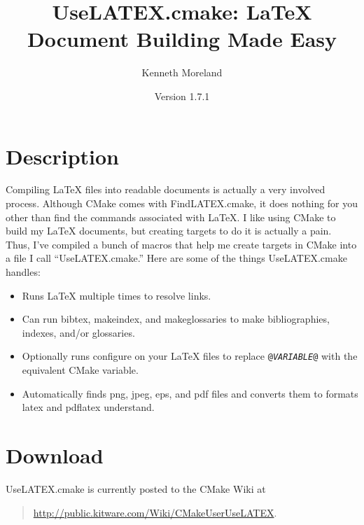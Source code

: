 \documentclass{article}
\newcommand{\UseLATEXVersion}{1.7.1}
\newcommand*{\textfile}[1]{\textsf{#1}}
\newcommand*{\textprog}[1]{\textfile{#1}}
\newcommand*{\textcmake}[1]{\texttt{#1}}
\newcommand*{\textvar}[1]{\textit{#1}}
\newcommand*{\UseLATEX}{\textfile{UseLATEX.cmake}\xspace}
\newcommand*{\latex}{\LaTeX\xspace}
\begin{document}
  \sloppy

  \title{UseLATEX.cmake: \latex Document Building Made Easy}
  \author{Kenneth Moreland}
  \date{Version \UseLATEXVersion}
  \maketitle

  \tableofcontents


  \section{Description}
  \label{sec:Description}

  Compiling \latex files into readable documents is actually a very
  involved process. Although CMake comes with \textfile{FindLATEX.cmake},
  it does nothing for you other than find the commands associated with
  \latex. I like using CMake to build my \latex documents, but creating
  targets to do it is actually a pain. Thus, I've compiled a bunch of
  macros that help me create targets in CMake into a file I call
  ``\UseLATEX.'' Here are some of the things \UseLATEX handles:

  \begin{itemize}
  \item Runs \latex multiple times to resolve links. 
  \item Can run \textprog{bibtex}, \textprog{makeindex}, and
    \textprog{makeglossaries} to make bibliographies, indexes, and/or
    glossaries.
  \item Optionally runs configure on your \latex files to replace
    \textcmake{@\textvar{VARIABLE}@} with the equivalent CMake variable.
  \item Automatically finds png, jpeg, eps, and pdf files and converts them
    to formats \textprog{latex} and \textprog{pdflatex} understand.
  \end{itemize}


  \section{Download}
  \label{sec:Download}

  \UseLATEX is currently posted to the CMake Wiki at
  \begin{quote}
    \href{http://public.kitware.com/Wiki/CMakeUserUseLATEX}{http://public.kitware.com/Wiki/CMakeUserUseLATEX}.
  \end{quote}
\end{document}
